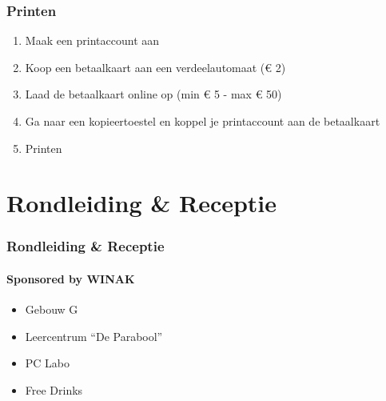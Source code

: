 \begin{frame}[allowframebreaks=10]
	\frametitle{Printen}
    
    \vspace{0.5cm}
    
    \begin{enumerate}
       	\item Maak een printaccount aan
        \item Koop een betaalkaart aan een verdeelautomaat (€ 2)
        \item Laad de betaalkaart online op (min € 5 - max € 50)
        \item  Ga naar een kopieertoestel en koppel je printaccount aan de betaalkaart
        \item Printen
    \end{enumerate}
\end{frame}

\section{Rondleiding \& Receptie}
\begin{frame}
	\frametitle{Rondleiding \& Receptie}
	\framesubtitle{Sponsored by WINAK}
    \begin{itemize}
       	\item Gebouw G
        \item Leercentrum ``De Parabool''
        \item PC Labo
        \item Free Drinks
	\end{itemize}
\end{frame}
